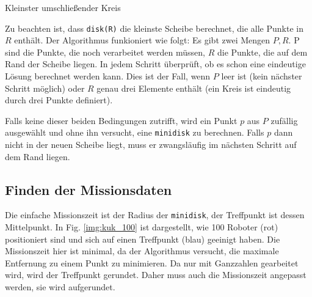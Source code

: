 \documentclass{article}
\begin{document}
\begin{algorithm}[H]
    \caption{Kleinster umschließender Kreis}

    \BlankLine
    
\end{algorithm} 

Zu beachten ist, dass \texttt{disk(R)} die kleinste Scheibe berechnet, die alle Punkte in $R$ enthält. Der Algorithmus funkioniert wie folgt:
Es gibt zwei Mengen $P,R$. P sind die Punkte, die noch verarbeitet werden müssen, $R$ die Punkte, die auf dem Rand der Scheibe liegen. In jedem
Schritt überprüft, ob es schon eine eindeutige Lösung berechnet werden kann. Dies ist der Fall, wenn $P$ leer ist (kein nächster Schritt möglich) oder $R$ genau drei Elemente enthält (ein Kreis ist eindeutig durch drei Punkte definiert). 

Falls keine dieser beiden Bedingungen zutrifft, wird ein Punkt $p$ aus $P$ zufällig ausgewählt und ohne ihn versucht, eine \texttt{minidisk} zu berechnen. Falls $p$  dann nicht in der neuen Scheibe liegt, muss er zwangsläufig im nächsten Schritt auf dem Rand liegen.

\subsection{Finden der Missionsdaten}

Die einfache Missionszeit ist der Radius der \texttt{minidisk}, der Treffpunkt ist dessen Mittelpunkt. In Fig. \ref{img:kuk_100} ist dargestellt,
wie 100 Roboter (rot) positioniert sind und sich auf einen Treffpunkt (blau) geeinigt haben. Die Missionszeit hier ist minimal, da der Algorithmus versucht, die maximale Entfernung zu einem Punkt zu minimieren. Da nur mit Ganzzahlen gearbeitet wird, wird der Treffpunkt gerundet. Daher muss auch die Missionszeit angepasst werden, sie wird aufgerundet.
\end{document}
